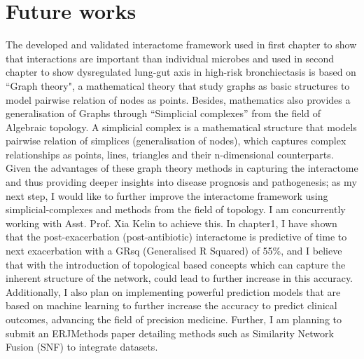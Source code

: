 \chapter*{Future works}

The developed and validated interactome framework used in first chapter to show that interactions are important than individual microbes and used in second chapter to show dysregulated lung-gut axis in high-risk bronchiectasis is based on ``Graph theory", a mathematical theory that study graphs as basic structures to model pairwise relation of nodes as points. Besides, mathematics also provides a generalisation of Graphs through ``Simplicial complexes'' from the field of Algebraic topology. A simplicial complex is a mathematical structure that models pairwise relation of simplices (generalisation of nodes), which captures complex relationships as points, lines, triangles and their n-dimensional counterparts. Given the advantages of these graph theory methods in capturing the interactome and thus providing deeper insights into disease prognosis and pathogenesis; as my next step, I would like to further improve the interactome framework using simplicial-complexes and methods from the field of topology. I am concurrently working with Asst. Prof. Xia Kelin to achieve this. In chapter1, I have shown that the post-exacerbation (post-antibiotic) interactome is predictive of time to next exacerbation with a GRsq (Generalised R Squared) of 55\%,
and I believe that with the introduction of topological based concepts which can capture the inherent structure of the network, could lead to further increase in this accuracy. Additionally, I also plan on implementing powerful prediction models that are based on machine learning to further increase the accuracy to predict clinical outcomes, advancing the field of precision medicine. Further, I am planning to submit an ERJMethods paper detailing methods such as Similarity Network Fusion (SNF) to integrate datasets.

